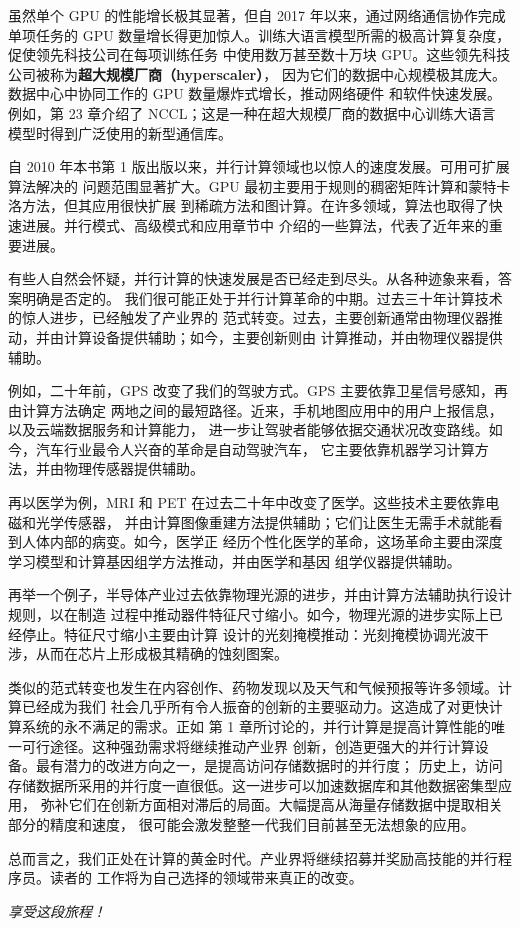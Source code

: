 虽然单个 GPU 的性能增长极其显著，但自 2017 年以来，通过网络通信协作完成单项任务的 GPU
数量增长得更加惊人。训练大语言模型所需的极高计算复杂度，促使领先科技公司在每项训练任务
中使用数万甚至数十万块 GPU。这些领先科技公司被称为\textbf{超大规模厂商（hyperscaler）}，
因为它们的数据中心规模极其庞大。数据中心中协同工作的 GPU 数量爆炸式增长，推动网络硬件
和软件快速发展。例如，第 23 章介绍了 NCCL；这是一种在超大规模厂商的数据中心训练大语言
模型时得到广泛使用的新型通信库。

自 2010 年本书第 1 版出版以来，并行计算领域也以惊人的速度发展。可用可扩展算法解决的
问题范围显著扩大。GPU 最初主要用于规则的稠密矩阵计算和蒙特卡洛方法，但其应用很快扩展
到稀疏方法和图计算。在许多领域，算法也取得了快速进展。并行模式、高级模式和应用章节中
介绍的一些算法，代表了近年来的重要进展。

有些人自然会怀疑，并行计算的快速发展是否已经走到尽头。从各种迹象来看，答案明确是否定的。
我们很可能正处于并行计算革命的中期。过去三十年计算技术的惊人进步，已经触发了产业界的
范式转变。过去，主要创新通常由物理仪器推动，并由计算设备提供辅助；如今，主要创新则由
计算推动，并由物理仪器提供辅助。

例如，二十年前，GPS 改变了我们的驾驶方式。GPS 主要依靠卫星信号感知，再由计算方法确定
两地之间的最短路径。近来，手机地图应用中的用户上报信息，以及云端数据服务和计算能力，
进一步让驾驶者能够依据交通状况改变路线。如今，汽车行业最令人兴奋的革命是自动驾驶汽车，
它主要依靠机器学习计算方法，并由物理传感器提供辅助。

再以医学为例，MRI 和 PET 在过去二十年中改变了医学。这些技术主要依靠电磁和光学传感器，
并由计算图像重建方法提供辅助；它们让医生无需手术就能看到人体内部的病变。如今，医学正
经历个性化医学的革命，这场革命主要由深度学习模型和计算基因组学方法推动，并由医学和基因
组学仪器提供辅助。

再举一个例子，半导体产业过去依靠物理光源的进步，并由计算方法辅助执行设计规则，以在制造
过程中推动器件特征尺寸缩小。如今，物理光源的进步实际上已经停止。特征尺寸缩小主要由计算
设计的光刻掩模推动：光刻掩模协调光波干涉，从而在芯片上形成极其精确的蚀刻图案。

类似的范式转变也发生在内容创作、药物发现以及天气和气候预报等许多领域。计算已经成为我们
社会几乎所有令人振奋的创新的主要驱动力。这造成了对更快计算系统的永不满足的需求。正如
第 1 章所讨论的，并行计算是提高计算性能的唯一可行途径。这种强劲需求将继续推动产业界
创新，创造更强大的并行计算设备。最有潜力的改进方向之一，是提高访问存储数据时的并行度；
历史上，访问存储数据所采用的并行度一直很低。这一进步可以加速数据库和其他数据密集型应用，
弥补它们在创新方面相对滞后的局面。大幅提高从海量存储数据中提取相关部分的精度和速度，
很可能会激发整整一代我们目前甚至无法想象的应用。

总而言之，我们正处在计算的黄金时代。产业界将继续招募并奖励高技能的并行程序员。读者的
工作将为自己选择的领域带来真正的改变。

\begin{center}
  \large\textit{享受这段旅程！}
\end{center}

